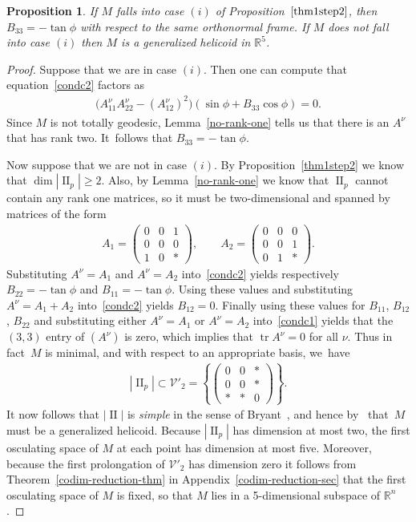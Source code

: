 \documentclass[10pt,a4paper]{amsart}
\def\R{\mathbb{R}}
\def\II{\operatorname{II}} %
\def\V{\mathscr{V}}
\def\tr{\operatorname{tr}}
\newtheorem{Proposition}[Theorem]{Proposition}
\numberwithin{equation}{section}
\begin{document}
\begin{Proposition} \label{thm1step3}
If $M$ falls into case $(i)$ of Proposition~$\ref{thm1step2}$, then $B_{33}=-\tan\phi$ with respect to the same orthonormal frame.
If $M$ does not fall into case $(i)$ then $M$ is a generalized helicoid in $\R^5$.
\end{Proposition}
\begin{proof}
Suppose that we are in case $(i)$. Then one can compute that equation~\eqref{condc2} factors as
\begin{gather*}
\big(A^\nu_{11} A^\nu_{22}-(A^\nu_{12})^2\big) (\sin\phi + B_{33}\cos\phi) = 0.
\end{gather*}
Since $M$ is not totally geodesic, Lemma~\ref{no-rank-one} tells us that there is an $A^\nu$ that has rank two. It~follows that $B_{33}=-\tan\phi$.

Now suppose that we are not in case $(i)$. By Proposition~\ref{thm1step2} we know that $\dim |\II_p| \ge 2$. Also, by Lemma~\ref{no-rank-one} we know that $\II_p$ cannot contain any rank one matrices, so it must be two-dimensional and spanned by matrices of the form
\begin{gather*}
A_1 = \begin{pmatrix} 0 & 0 & 1 \\ 0 & 0 & 0 \\ 1 & 0 & * \end{pmatrix}, \qquad
A_2 = \begin{pmatrix} 0 & 0 & 0 \\ 0 & 0 & 1 \\ 0 & 1 & * \end{pmatrix}.
\end{gather*}
{\sloppy Substituting $A^\nu=A_1$ and $A^\nu=A_2$ into~\eqref{condc2} yields respectively $B_{22} = -\tan \phi$ and \mbox{$B_{11}=-\tan\phi$}. Using these values
and substituting $A^\nu = A_1 + A_2$ into~\eqref{condc2} yields $B_{12}=0$. Fina\-lly using these values for $B_{11}$, $B_{12}$, $B_{22}$ and substituting either $A^\nu= A_1$ or $A^\nu =A_2$ into~\eqref{condc1} yields that the $(3,3)$ entry of $(A^{\nu})$ is zero, which implies that $\tr A^\nu = 0$ for all $\nu$. Thus in fact~$M$ is minimal, and with respect to an appropriate basis, we~have
\begin{gather*}
|\II_p| \subset \V'_2= \left\{\!\! \begin{pmatrix} 0 & 0 & * \\ 0 & 0 & * \\ * & * & 0\end{pmatrix} \!\!\right\}.
\end{gather*}}\noindent
It now follows that $|\II|$ is \emph{simple} in the sense of Bryant~\cite{Br}, and hence by~\cite[Theorem 3.1]{Br} that~$M$ must be a generalized helicoid. Because $|\II_p|$ has dimension at most two, the first osculating space of $M$ at each point has dimension at most five. Moreover, because the first prolongation of $\V'_2$ has dimension zero it follows from Theorem~\ref{codim-reduction-thm} in Appendix~\ref{codim-reduction-sec} that the first osculating space of $M$ is fixed, so that $M$ lies in a 5-dimensional subspace of $\R^n$.
\end{proof}
\end{document}
